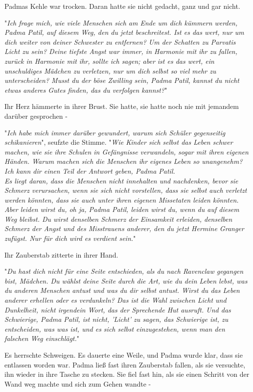 {Padmas Kehle war trocken. Daran hatte sie nicht gedacht, ganz und gar nicht.

"\emph{Ich frage mich, wie viele Menschen sich am Ende um dich kümmern werden, Padma Patil, auf diesem Weg, den du jetzt beschreitest. Ist es das wert, nur um dich weiter von deiner Schwester zu entfernen? Um der Schatten zu Parvatis Licht zu sein? Deine tiefste Angst war immer, in Harmonie mit ihr zu fallen, zurück in Harmonie mit ihr, sollte ich sagen; aber ist es das wert, ein unschuldiges Mädchen zu verletzen, nur um dich selbst so viel mehr zu unterscheiden? Musst du der böse Zwilling sein, Padma Patil, kannst du nicht etwas anderes Gutes finden, das du verfolgen kannst?}"

Ihr Herz hämmerte in ihrer Brust. Sie hatte, sie hatte noch nie mit jemandem darüber gesprochen -

"\emph{Ich habe mich immer darüber gewundert, warum sich Schüler gegenseitig schikanieren}", seufzte die Stimme. "\emph{Wie Kinder sich selbst das Leben schwer machen, wie sie ihre Schulen in Gefängnisse verwandeln, sogar mit ihren eigenen Händen. Warum machen sich die Menschen ihr eigenes Leben so unangenehm? Ich kann dir einen Teil der Antwort geben, Padma Patil.\\ } \emph{Es liegt daran, dass die Menschen nicht innehalten und nachdenken, bevor sie Schmerz verursachen, wenn sie sich nicht vorstellen, dass sie selbst auch verletzt werden könnten, dass sie auch unter ihren eigenen Missetaten leiden könnten.\\ Aber leiden wirst du, oh ja, Padma Patil, leiden wirst du, wenn du auf diesem Weg bleibst. Du wirst denselben Schmerz der Einsamkeit erleiden, denselben Schmerz der Angst und des Misstrauens anderer, den du jetzt Hermine Granger zufügst. Nur für dich wird es verdient sein.}"

Ihr Zauberstab zitterte in ihrer Hand.

"\emph{Du hast dich nicht für eine Seite entschieden, als du nach Ravenclaw gegangen bist, Mädchen. Du wählst deine Seite durch die Art, wie du dein Leben lebst, was du anderen Menschen antust und was du dir selbst antust. Wirst du das Leben anderer erhellen oder es verdunkeln? Das ist die Wahl zwischen Licht und Dunkelheit, nicht irgendein Wort, das der Sprechende Hut ausruft. Und das Schwierige, Padma Patil, ist nicht, 'Licht' zu sagen, das Schwierige ist, zu entscheiden, was was ist, und es sich selbst einzugestehen, wenn man den falschen Weg einschlägt.}"

Es herrschte Schweigen. Es dauerte eine Weile, und Padma wurde klar, dass sie entlassen worden war. Padma ließ fast ihren Zauberstab fallen, als sie versuchte, ihn wieder in ihre Tasche zu stecken. Sie fiel fast hin, als sie einen Schritt von der Wand weg machte und sich zum Gehen wandte -

}
